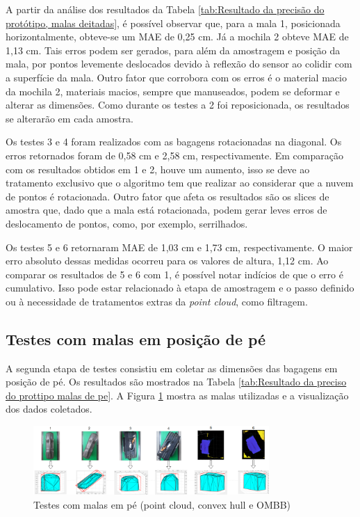     A partir da análise dos resultados da Tabela \ref{tab:Resultado da precisão do protótipo, malas deitadas}, é possível observar que, para a mala 1, posicionada horizontalmente, obteve-se um MAE de 0,25 cm. Já a mochila 2 obteve MAE de 1,13 cm. Tais erros podem ser gerados, para além da amostragem e posição da mala, por pontos levemente deslocados devido à reflexão do sensor ao colidir com a superfície da mala. Outro fator que corrobora com os erros é o material macio da mochila 2, materiais macios, sempre que manuseados, podem se deformar e alterar as dimensões. Como durante os testes a 2 foi reposicionada, os resultados se alterarão em cada amostra.
    
    Os testes 3 e 4 foram realizados com as bagagens rotacionadas na diagonal. Os erros retornados foram de 0,58 cm e 2,58 cm, respectivamente. Em comparação com os resultados obtidos em 1 e 2, houve um aumento, isso se deve ao tratamento exclusivo que o algoritmo tem que realizar ao considerar que a nuvem de pontos é rotacionada. Outro fator que afeta os resultados são os slices de amostra que, dado que a mala está rotacionada, podem gerar leves erros de deslocamento de pontos, como, por exemplo, serrilhados. 
    
    Os testes 5 e 6 retornaram MAE de 1,03 cm e 1,73 cm, respectivamente. O maior erro absoluto dessas medidas ocorreu para os valores de altura, 1,12 cm. Ao comparar os resultados de 5 e 6 com 1, é possível notar indícios de que o erro é cumulativo. Isso pode estar relacionado à etapa de amostragem e o passo definido ou à necessidade de tratamentos extras da \textit{point cloud}, como filtragem.


\subsection{Testes com malas em posição de pé}
\label{sec_Testes com mala em posição de pe}

A segunda etapa de testes consistiu em coletar as dimensões das bagagens em posição de pé. Os resultados são mostrados na Tabela \ref{tab:Resultado da preciso do prottipo malas de pe}. A Figura \ref{fig:Malas_Em_Pe} mostra as malas utilizadas e a visualização dos dados coletados.

        \begin{figure}[h]
           \centering
           \includegraphics[width=0.8\textwidth]{imagens/imagens_tabelas/resultadosMalasEmPe/Malas_Em_Pe.png} 
           \caption{Testes com malas em pé (point cloud, convex hull e OMBB)}
           \label{fig:Malas_Em_Pe}
        \end{figure}


